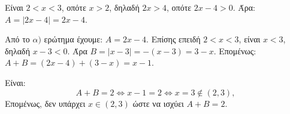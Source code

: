 
\begin{alist}
\item Είναι $2 < x < 3$, οπότε $x > 2$, δηλαδή $2x > 4$, οπότε $2x - 4 > 0$.
Άρα:
$A = |2x - 4| = 2x - 4$.

\item Από το $\alpha)$ ερώτημα έχουμε: $A = 2x - 4$.
Επίσης επειδή $2 < x < 3$, είναι $x < 3$, δηλαδή $x - 3 < 0$. Άρα $B = |x - 3| = -(x - 3) = 3 - x$.
Επομένως:
$A + B = (2x - 4) + (3 - x) = x - 1$.

\item Είναι:
\[A + B = 2 \Leftrightarrow x - 1 = 2 \Leftrightarrow x = 3 \notin (2, 3),\]
Επομένως, δεν υπάρχει $x \in (2, 3)$ ώστε να ισχύει $A + B = 2$.
\end{alist}

